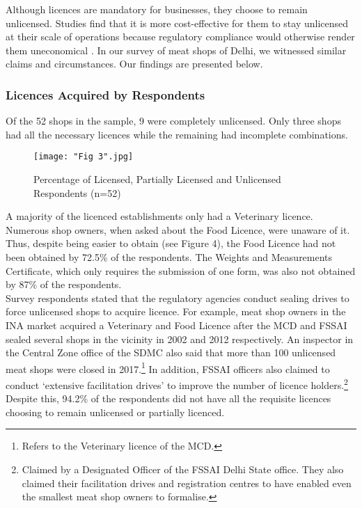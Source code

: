 \documentclass[a4paper, 12pt]{article}
\begin{document}
Although licences are mandatory for businesses, they choose to remain unlicensed. Studies find that it is more cost-effective for them to stay unlicensed at their scale of operations because regulatory compliance would otherwise render them uneconomical \parencite{desotopaper} \parencite{duttapaper} \parencite{laportapaper}. In our survey of meat shops of Delhi, we witnessed similar claims and circumstances. Our findings are presented below. \\

\subsubsection{Licences Acquired by Respondents}
Of the 52 shops in the sample, 9 were completely unlicensed. Only three shops had all the necessary licences while the remaining had incomplete combinations.\\

\begin{figure}[H]
\centering
\texttt{[image: "Fig 3".jpg]}
\caption{Percentage of Licensed, Partially Licensed and Unlicensed Respondents (n=52)}
\end{figure} 



A majority of the licenced establishments only had a Veterinary licence. Numerous shop owners, when asked about the Food Licence, were unaware of it. Thus, despite being easier to obtain (see Figure 4), the Food Licence had not been obtained by 72.5\% of the respondents. The Weights and Measurements Certificate, which only requires the submission of one form, was also not obtained by 87\% of the respondents. \\

Survey respondents stated that the regulatory agencies conduct sealing drives to force unlicensed shops to acquire licence. For example, meat shop owners in the INA market acquired a Veterinary and Food Licence after the MCD and FSSAI sealed several shops in the vicinity in 2002 and 2012 respectively. An inspector in the Central Zone office of the SDMC also said that more than 100 unlicensed meat shops were closed in 2017.\footnote{ Refers to the Veterinary licence of the MCD.} In addition, FSSAI officers also claimed to conduct ‘extensive facilitation drives’ to improve the number of licence holders.\footnote{Claimed by a Designated Officer of the FSSAI Delhi State office. They also claimed their facilitation drives and registration centres to have enabled even the smallest meat shop owners to formalise.}
Despite this, 94.2\% of the respondents did not have all the requisite licences choosing to remain unlicensed or partially licenced.\\
\end{document}
